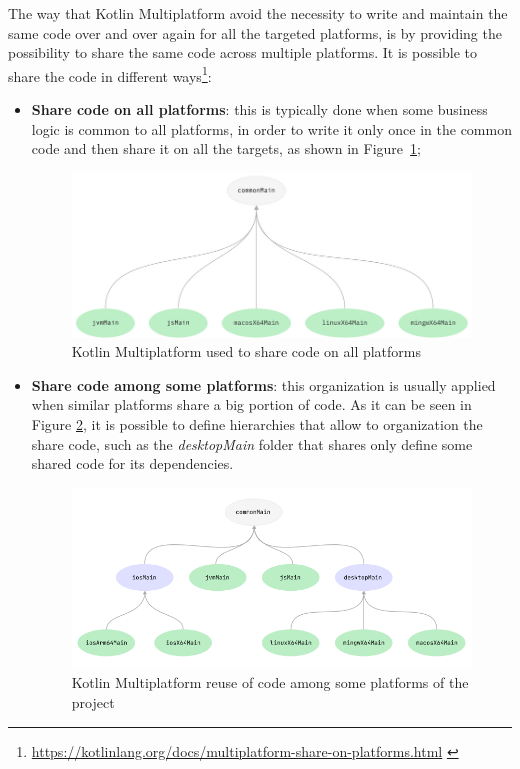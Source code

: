 The way that Kotlin Multiplatform avoid the necessity to write and maintain the same code over and over again for all the targeted platforms, is by providing the possibility to share the same code across multiple platforms.\newline
It is possible to share the code in different ways\footnote{\url{https://kotlinlang.org/docs/multiplatform-share-on-platforms.html} \label{km_share_footnote}}:
\begin{itemize}
    \item \textbf{Share code on all platforms}: this is typically done when some business logic is common to all platforms, in order to write it only once in the common code and then share it on all the targets, as shown in Figure~\ref{fig:km_share_code_on_all_platforms};
    \begin{figure}[!ht]
        \centering
        \includegraphics[scale=0.86]{document/chapters/4-collektive/images/km_share_code_on_all_platforms.png}
        \caption{Kotlin Multiplatform used to share code on all platforms}
        \label{fig:km_share_code_on_all_platforms}
    \end{figure}
    \item \textbf{Share code among some platforms}: this organization is usually applied when similar platforms share a big portion of code. As it can be seen in Figure \ref{fig:km_reuse_code}, it is possible to define hierarchies that allow to organization the share code, such as the \textit{desktopMain} folder that shares only define some shared code for its dependencies.
    \begin{figure}[!ht]
        \centering
        \includegraphics[scale=0.97]{document/chapters/4-collektive/images/kotlin_multiplatform_reuse_code.png}
        \caption{Kotlin Multiplatform reuse of code among some platforms of the project}
        \label{fig:km_reuse_code}
    \end{figure}
\end{itemize}

